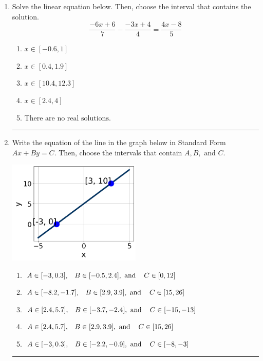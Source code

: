 \documentclass[14pt]{extbook}
\newcommand{\litem}[1]{\item#1\hspace*{-1cm}\rule{\textwidth}{0.4pt}}
\begin{document}
\begin{enumerate}
{\begin{enumerate}[label=\Alph*.]
\end{enumerate} }
\litem{
Solve the linear equation below. Then, choose the interval that contains the solution.\[ \frac{-6x + 6}{7} - \frac{-3x + 4}{4} = \frac{4x -8}{5} \]\begin{enumerate}[label=\Alph*.]
\item \( x \in [-0.6, 1] \)
\item \( x \in [0.4, 1.9] \)
\item \( x \in [10.4, 12.3] \)
\item \( x \in [2.4, 4] \)
\item \( \text{There are no real solutions.} \)

\end{enumerate} }
\litem{
Write the equation of the line in the graph below in Standard Form $Ax+By=C$. Then, choose the intervals that contain $A, B, \text{ and } C$.
\begin{center}
    \includegraphics[width=0.5\textwidth]{../Figures/linearGraphToStandardCopyC.png}
\end{center}
\begin{enumerate}[label=\Alph*.]
\item \( A \in [-3, 0.3], \hspace{3mm} B \in [-0.5, 2.4], \text{ and } \hspace{3mm} C \in [0, 12] \)
\item \( A \in [-8.2, -1.7], \hspace{3mm} B \in [2.9, 3.9], \text{ and } \hspace{3mm} C \in [15, 26] \)
\item \( A \in [2.4, 5.7], \hspace{3mm} B \in [-3.7, -2.4], \text{ and } \hspace{3mm} C \in [-15, -13] \)
\item \( A \in [2.4, 5.7], \hspace{3mm} B \in [2.9, 3.9], \text{ and } \hspace{3mm} C \in [15, 26] \)
\item \( A \in [-3, 0.3], \hspace{3mm} B \in [-2.2, -0.9], \text{ and } \hspace{3mm} C \in [-8, -3] \)


\end{enumerate}}
\end{enumerate}
\end{document}

